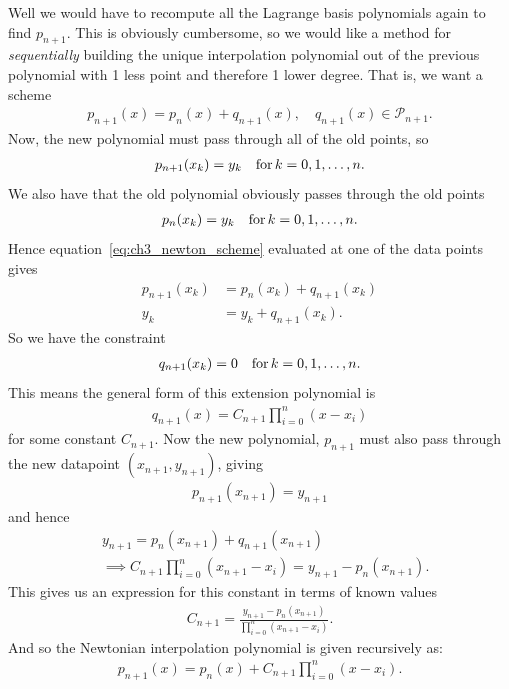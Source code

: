 Well we would have to recompute all the Lagrange basis polynomials again to find $p_{n+1}$. This is obviously cumbersome, so we would like a method for \textit{sequentially} building the unique interpolation polynomial out of the previous polynomial with 1 less point and therefore 1 lower degree. That is, we want a scheme
\begin{align}\label{eq:ch3_newton_scheme}
p_{n+1}(x) = p_n(x) + q_{n+1}(x), \quad q_{n+1}(x) \in \mathcal{P}_{n+1}.
\end{align}
Now, the new polynomial must pass through all of the old points, so
\begin{align*}
p_{n+1}(x_k) = y_k \quad {\rm for} \, k=0,1,\dots,n.
\end{align*}
We also have that the old polynomial obviously passes through the old points
\begin{align*}
p_n(x_k) = y_k \quad {\rm for} \, k=0,1,\dots,n.
\end{align*}
Hence equation~\ref{eq:ch3_newton_scheme} evaluated at one of the data points gives
\begin{align*}
 p_{n+1}(x_k) &= p_n(x_k) + q_{n+1}(x_k) \\
 y_k &= y_k + q_{n+1}(x_k).
\end{align*}
So we have the constraint
\begin{align*}
q_{n+1}(x_k) = 0 \quad {\rm for} \, k=0,1,\dots,n.
\end{align*}
This means the general form of this extension polynomial is
\begin{align*}
q_{n+1}(x) = C_{n+1} \prod_{i=0}^{n} (x-x_i)
\end{align*}
for some constant $C_{n+1}$. Now the new polynomial, $p_{n+1}$ must also pass through the new datapoint $(x_{n+1},y_{n+1})$, giving
\begin{align*}
p_{n+1}(x_{n+1}) = y_{n+1}
\end{align*}
and hence
\begin{align*}
& y_{n+1} = p_n(x_{n+1}) + q_{n+1}(x_{n+1}) \\
&\implies C_{n+1} \prod_{i=0}^{n} (x_{n+1}-x_i) = y_{n+1} - p_n(x_{n+1}).
\end{align*}
This gives us an expression for this constant in terms of known values
\begin{align*}
\boxed{C_{n+1} = \frac{y_{n+1} - p_n(x_{n+1})}{\prod_{i=0}^{n} (x_{n+1}-x_i)}. }
\end{align*}
And so the Newtonian interpolation polynomial is given recursively as:
\begin{align}\label{eq:ch3_newton_scheme_explicit}
\boxed{p_{n+1}(x) = p_n(x) + C_{n+1}\prod_{i=0}^{n} (x-x_i).}
\end{align}
